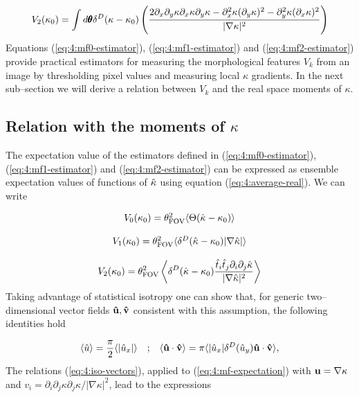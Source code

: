 \begin{equation}
\label{eq:4:mf2-estimator}
V_2(\kappa_0) = \int d\pmb{\theta} \delta^D(\kappa-\kappa_0)\left(\frac{2\partial_x\partial_y\kappa\partial_x\kappa\partial_y\kappa-\partial^2_x\kappa(\partial_y\kappa)^2-\partial_y^2\kappa(\partial_x\kappa)^2}{\vert\nabla\kappa\vert^2}\right)
\end{equation}
%
Equations (\ref{eq:4:mf0-estimator}), (\ref{eq:4:mf1-estimator}) and (\ref{eq:4:mf2-estimator}) provide practical estimators for measuring the morphological features $V_k$ from an image by thresholding pixel values and measuring local $\kappa$ gradients. In the next sub--section we will derive a relation between $V_k$ and the real space moments of $\kappa$.  

\subsection{Relation with the moments of $\kappa$}
\label{sec:4:mink-mom}
The expectation value of the estimators defined in (\ref{eq:4:mf0-estimator}), (\ref{eq:4:mf1-estimator}) and (\ref{eq:4:mf2-estimator}) can be expressed as ensemble expectation values of functions of $\hat{\kappa}$ using equation (\ref{eq:4:average-real}). We can write

\begin{equation}
\label{eq:4:mf-expectation}
\begin{matrix}
V_0(\kappa_0) = \theta_{\rm FOV}^2\langle\Theta(\hat{\kappa}-\kappa_0)\rangle \\ \\
V_1(\kappa_0) = \theta_{\rm FOV}^2\langle\delta^D(\hat{\kappa}-\kappa_0)\vert\nabla\hat{\kappa}\vert\rangle \\ \\
\displaystyle V_2(\kappa_0) = \theta_{\rm FOV}^2\left\langle\delta^D(\hat{\kappa}-\kappa_0)\frac{\hat{t}_i\hat{t}_j\partial_i\partial_j\hat{\kappa}}{\vert\nabla\hat{\kappa}\vert^2}\right\rangle
\end{matrix}
\end{equation}
%
Taking advantage of statistical isotropy one can show that, for generic two--dimensional vector fields $\mathbf{\hat{u}},\mathbf{\hat{v}}$ consistent with this assumption, the following identities hold

\begin{equation}
\label{eq:4:iso-vectors}
\begin{matrix}
\displaystyle \langle\hat{u}\rangle = \frac{\pi}{2}\langle\vert\hat{u}_x\vert\rangle & ; & \displaystyle \langle\mathbf{\hat{u}}\cdot\mathbf{\hat{v}}\rangle = \pi\langle\vert \hat{u}_x\vert\delta^D (\hat{u}_y)\mathbf{\hat{u}}\cdot\mathbf{\hat{v}}\rangle,
\end{matrix}
\end{equation}
%
The relations (\ref{eq:4:iso-vectors}), applied to (\ref{eq:4:mf-expectation}) with $\mathbf{u}=\nabla\kappa$ and $v_i=\partial_i\partial_j\kappa\partial_j\kappa/\vert\nabla\kappa\vert^2$, lead to the expressions

